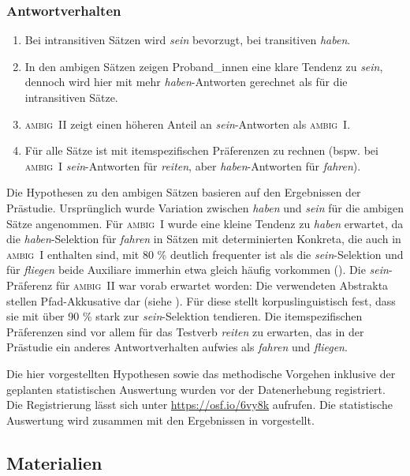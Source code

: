 \subsubsection{Antwortverhalten}
\begin{enumerate}
\item Bei intransitiven Sätzen wird \textit{sein} bevorzugt, bei transitiven \textit{haben}.
\item In den ambigen Sätzen zeigen Proband\_innen eine klare Tendenz zu \textit{sein}, dennoch wird hier mit mehr \textit{haben}-Antworten gerechnet als für die intransitiven Sätze.
\item \textsc{ambig~II} zeigt einen höheren Anteil an \textit{sein}-Antworten als \textsc{ambig~I}.
\item Für alle Sätze ist mit itemspezifischen Präferenzen zu rechnen (bspw. bei \textsc{ambig~I} \textit{sein}-Antworten für \textit{reiten}, aber \textit{haben}-Antworten für \textit{fahren}).
\end{enumerate}


Die Hypothesen zu den ambigen Sätzen basieren auf den Ergebnissen der Prästudie. Ursprünglich wurde Variation zwischen \textit{haben} und \textit{sein} für die ambigen Sätze angenommen. Für \textsc{ambig~I} wurde eine kleine Tendenz zu \textit{haben} erwartet, da die \textit{haben}-Selektion für \textit{fahren} in Sätzen mit determinierten Konkreta, die auch in \textsc{ambig~I} enthalten sind, mit 80 \% deutlich frequenter ist als die \textit{sein}-Selektion und für \textit{fliegen} beide Auxiliare immerhin etwa gleich häufig vorkommen (\cite[288--290]{Gillmann.2016}). Die \textit{sein}-Präferenz für \textsc{ambig~II} war vorab erwartet worden: Die verwendeten Abstrakta stellen Pfad-Akkusative dar (siehe ). Für diese stellt \textcite[299--301]{Gillmann.2016} korpuslinguistisch fest, dass sie mit über 90 \% stark zur \textit{sein}-Selektion tendieren. Die itemspezifischen Präferenzen sind vor allem für das Testverb \textit{reiten} zu erwarten, das in der Prästudie ein anderes Antwortverhalten aufwies als \textit{fahren} und \textit{fliegen}.

Die hier vorgestellten Hypothesen sowie das methodische Vorgehen inklusive der geplanten statistischen Auswertung wurden vor der Datenerhebung registriert. Die Registrierung lässt sich unter \url{https://osf.io/6vy8k} aufrufen. Die statistische Auswertung wird zusammen mit den Ergebnissen in  vorgestellt.

\subsection{Materialien} 
\label{protmat}

